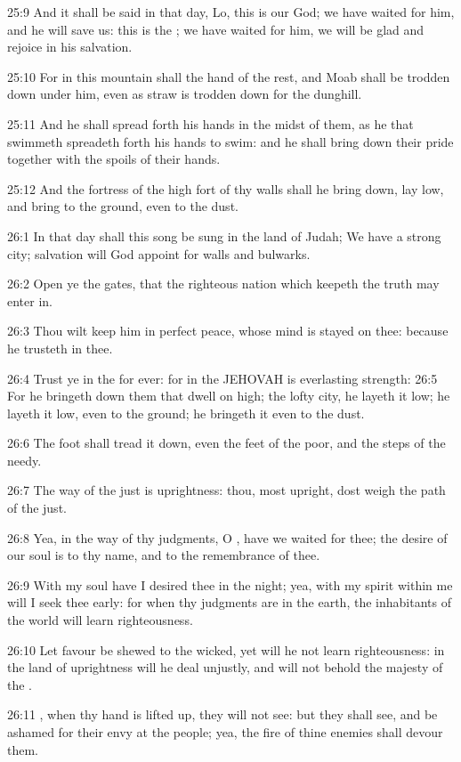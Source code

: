 25:9 And it shall be said in that day, Lo, this is our God; we have
waited for him, and he will save us: this is the \LORD; we have waited
for him, we will be glad and rejoice in his salvation.

25:10 For in this mountain shall the hand of the \LORD rest, and Moab
shall be trodden down under him, even as straw is trodden down for the
dunghill.

25:11 And he shall spread forth his hands in the midst of them, as he
that swimmeth spreadeth forth his hands to swim: and he shall bring
down their pride together with the spoils of their hands.

25:12 And the fortress of the high fort of thy walls shall he bring
down, lay low, and bring to the ground, even to the dust.

26:1 In that day shall this song be sung in the land of Judah; We have
a strong city; salvation will God appoint for walls and bulwarks.

26:2 Open ye the gates, that the righteous nation which keepeth the
truth may enter in.

26:3 Thou wilt keep him in perfect peace, whose mind is stayed on
thee: because he trusteth in thee.

26:4 Trust ye in the \LORD for ever: for in the \LORD JEHOVAH is
everlasting strength: 26:5 For he bringeth down them that dwell on
high; the lofty city, he layeth it low; he layeth it low, even to the
ground; he bringeth it even to the dust.

26:6 The foot shall tread it down, even the feet of the poor, and the
steps of the needy.

26:7 The way of the just is uprightness: thou, most upright, dost
weigh the path of the just.

26:8 Yea, in the way of thy judgments, O \LORD, have we waited for
thee; the desire of our soul is to thy name, and to the remembrance of
thee.

26:9 With my soul have I desired thee in the night; yea, with my
spirit within me will I seek thee early: for when thy judgments are in
the earth, the inhabitants of the world will learn righteousness.

26:10 Let favour be shewed to the wicked, yet will he not learn
righteousness: in the land of uprightness will he deal unjustly, and
will not behold the majesty of the \LORD.

26:11 \LORD, when thy hand is lifted up, they will not see: but they
shall see, and be ashamed for their envy at the people; yea, the fire
of thine enemies shall devour them.

